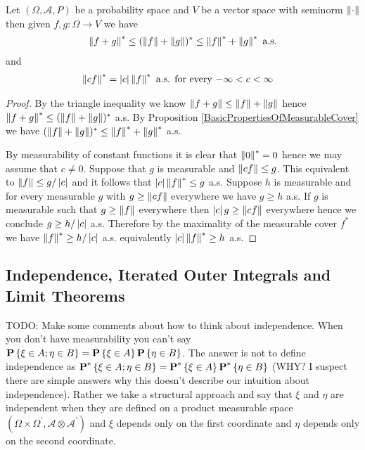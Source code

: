 \begin{lem}\label{MeasurableCoverTriangleInequality}Let $(\Omega, \mathcal{A}, P)$  be a probability space  and $V$ be a vector space with seminorm $\left \lVert \cdot \right \rVert$ then given $f,g : \Omega \to V$ we have
\begin{align*}
\left \lVert f+g \right \rVert^* \leq (\left \lVert f \right \rVert+\left \lVert g \right \rVert)^* \leq \left \lVert f \right \rVert^* + \left \lVert g \right \rVert^* \text{ a.s.}
\end{align*}
and
\begin{align*}
\left \lVert c f \right \rVert^* &= \left \vert c \right \vert \left \lVert f \right \rVert^* \text{ a.s. for every $-\infty < c < \infty$}
\end{align*}
\end{lem}
\begin{proof}
By the triangle inequality we know $\left \lVert f+g \right \rVert \leq \left \lVert f \right \rVert+\left \lVert g \right \rVert$ hence $\left \lVert f+g \right \rVert^* \leq (\left \lVert f \right \rVert+\left \lVert g \right \rVert)^*$ a.s.  By Proposition \ref{BasicPropertiesOfMeasurableCover} we have $ (\left \lVert f \right \rVert+\left \lVert g \right \rVert)^* \leq \left \lVert f \right \rVert^* + \left \lVert g \right \rVert^*$ a.s.

By measurability of constant functions it is clear that $\left \lVert 0 \right \rVert^* = 0$ hence we may assume that $c \neq 0$.  Suppose that $g$ is measurable and $\left \lVert cf \right \rVert \leq g$.  This equivalent to $\left \lVert f \right \rVert \leq g/\left \vert c \right \vert$ and it follows that $\left \vert c \right \vert \left \lVert f \right \rVert^* \leq g$ a.s.  Suppose $h$ is measurable and for every measurable $g$ with $g \geq \left \lVert cf \right \rVert$ everywhere we have $g \geq h$ a.s.   If $g$ is measurable such that $g \geq \left \lVert f \right \rVert$ everywhere then $\left \vert c \right \vert g \geq \left \lVert c f \right \rVert$ everywhere hence we conclude $g \geq h/\left \vert c \right \vert$ a.s. Therefore by the maximality of the measurable cover $f^*$ we have $\left \lVert f \right \rVert^* \geq h/\left \vert c \right \vert$ a.s. equivalently $\left \vert c \right \vert\left \lVert f \right \rVert^* \geq h$ a.s.
\end{proof}

\subsection{Independence, Iterated Outer Integrals and Limit Theorems}

TODO: Make some comments about how to think about independence.  When you don't have measurability you can't say $\textbf{P}\left \{\xi \in A; \eta \in B \right \} = \textbf{P}\left \{\xi \in A \right \} \textbf{P}\left \{\eta \in B \right \}$.  The answer is not to define independence as $\textbf{P}^* \left \{\xi \in A; \eta \in B \right \} = \textbf{P}^* \left \{\xi \in A \right \} \textbf{P}^* \left \{\eta \in B \right \}$ (WHY?  I suspect there are simple answers why this doesn't describe our intuition about independence).  Rather we take a structural approach and say that $\xi$ and $\eta$ are independent when they are defined on a product measurable space $(\Omega \times \Omega^\prime, \mathcal{A} \otimes \mathcal{A}^\prime)$ and $\xi$ depends only on the first coordinate and $\eta$ depends only on the second coordinate.


